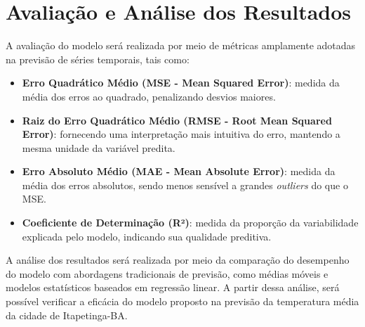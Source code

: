 \section{Avaliação e Análise dos Resultados}

    A avaliação do modelo será realizada por meio de métricas amplamente adotadas na previsão de 
    séries temporais, tais como: 
    \begin{itemize} 
        \item \textbf{Erro Quadrático Médio (MSE - Mean Squared Error)}: medida da média dos erros ao quadrado, 
        penalizando desvios maiores.
        \item \textbf{Raiz do Erro Quadrático Médio (RMSE - Root Mean Squared Error)}: fornecendo uma 
        interpretação mais intuitiva do erro, mantendo a mesma unidade da variável predita. 
        \item \textbf{Erro Absoluto Médio (MAE - Mean Absolute Error)}: medida da média dos erros absolutos, 
        sendo menos sensível a grandes \emph{outliers} do que o MSE. 
        \item \textbf{Coeficiente de Determinação (R²)}: medida da proporção da variabilidade explicada 
        pelo modelo, indicando sua qualidade preditiva. \end{itemize}

    A análise dos resultados será realizada por meio da comparação do desempenho do modelo com abordagens 
    tradicionais de previsão, como médias móveis e modelos estatísticos baseados em regressão linear. 
    A partir dessa análise, será possível verificar a eficácia do modelo proposto na previsão da 
    temperatura média da cidade de Itapetinga-BA.
